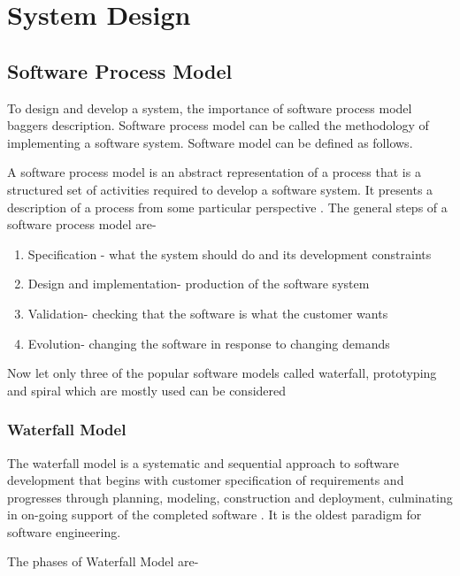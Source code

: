 \chapter{System Design} %
\label{Chapter 3}
\section{Software Process Model}
To design and develop a system, the importance of software process
model baggers description. Software process model can be called
the methodology of implementing a software system. Software model
can be defined as follows.

A software process model is an abstract representation of a
process that is a structured set of activities required to develop
a software system. It presents a description of a process from
some particular perspective \citep{bandinelli1993software}. The
general steps \citep{bandinelli1993software} of a software process
model are-


\begin{enumerate}
    \item {Specification - what the system should do and its development
constraints}
    \item {Design and implementation- production of the software
system }
    \item {Validation- checking that the software is what the
customer wants}
    \item {Evolution- changing the software in response to
changing demands}
\end{enumerate}

Now let only three of the popular software models called
waterfall, prototyping and spiral which are mostly used can be
considered


\subsection{Waterfall Model}
The waterfall model is a systematic and sequential approach to
software development that begins with customer specification of
requirements and progresses through planning, modeling,
construction and deployment, culminating in on-going support of
the completed software \citep{pressman2005software}. It is the
oldest paradigm for software engineering.

The phases \citep{bandinelli1993software} of Waterfall Model are-


